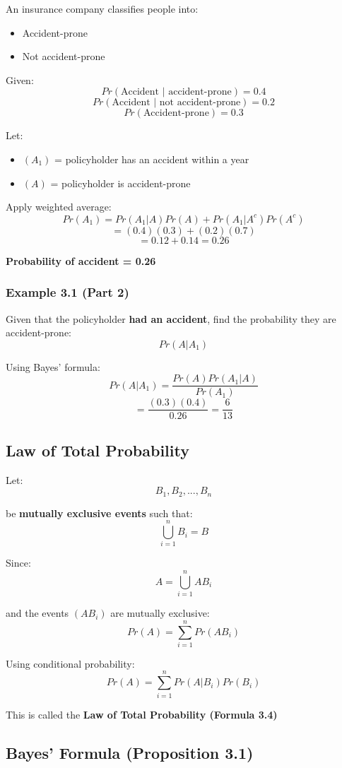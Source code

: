 \documentclass[12pt]{article}
\begin{document}
An insurance company classifies people into:

\begin{itemize}
\item Accident-prone
\item Not accident-prone
\end{itemize}

Given:
\[
Pr(\text{Accident | accident-prone}) = 0.4
\]
\[
Pr(\text{Accident | not accident-prone}) = 0.2
\]
\[
Pr(\text{Accident-prone}) = 0.3
\]

Let:
\begin{itemize}
\item $(A_1)$ = policyholder has an accident within a year
\item $(A)$ = policyholder is accident-prone
\end{itemize}

Apply weighted average:
\[
Pr(A_1) = Pr(A_1|A)Pr(A) + Pr(A_1|A^c)Pr(A^c)
\]
\[
= (0.4)(0.3) + (0.2)(0.7)
\]
\[
= 0.12 + 0.14 = 0.26
\]

\textbf{Probability of accident = 0.26}

\subsubsection*{Example 3.1 (Part 2)}

Given that the policyholder \textbf{had an accident}, find the probability they are accident-prone:
\[
Pr(A|A_1)
\]

Using Bayes’ formula:
\[
Pr(A|A_1) = \frac{Pr(A)Pr(A_1|A)}{Pr(A_1)}
\]
\[
= \frac{(0.3)(0.4)}{0.26} = \frac{6}{13}
\]

\subsection{Law of Total Probability}

Let:
\[
B_1, B_2, ..., B_n
\]

be \textbf{mutually exclusive events} such that:
\[
\bigcup_{i=1}^n B_i = B
\]

Since:
\[
A = \bigcup_{i=1}^n AB_i
\]

and the events $(AB_i)$ are mutually exclusive:
\[
Pr(A) = \sum_{i=1}^n Pr(AB_i)
\]

Using conditional probability:
\[
Pr(A) = \sum_{i=1}^n Pr(A|B_i)Pr(B_i)
\]

This is called the \textbf{Law of Total Probability (Formula 3.4)}

\subsection{Bayes’ Formula (Proposition 3.1)}
\end{document}
